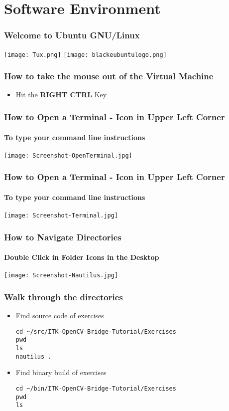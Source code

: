 \section{Software Environment}


\begin{frame}
\frametitle{Welcome to Ubuntu GNU/Linux}
\begin{center}
\texttt{[image: Tux.png]}
\texttt{[image: blackeubuntulogo.png]}
\end{center}
\end{frame}

\begin{frame}
\frametitle{How to take the mouse out of the Virtual Machine}
\begin{itemize}
\item Hit the \textbf{RIGHT CTRL} Key
\end{itemize}
\end{frame}

\begin{frame}
\frametitle{How to Open a Terminal - Icon in Upper Left Corner}
\framesubtitle{To type your command line instructions}
\begin{center}
\texttt{[image: Screenshot-OpenTerminal.jpg]}
\end{center}
\end{frame}

\begin{frame}
\frametitle{How to Open a Terminal - Icon in Upper Left Corner}
\framesubtitle{To type your command line instructions}
\begin{center}
\texttt{[image: Screenshot-Terminal.jpg]}
\end{center}
\end{frame}

\begin{frame}
\frametitle{How to Navigate Directories}
\framesubtitle{Double Click in Folder Icons in the Desktop}
\begin{center}
\texttt{[image: Screenshot-Nautilus.jpg]}
\end{center}
\end{frame}

\begin{frame}[fragile]
\frametitle{Walk through the directories}
\begin{itemize}
\item Find source code of exercises
\begin{verbatim}
cd ~/src/ITK-OpenCV-Bridge-Tutorial/Exercises
pwd
ls
nautilus .
\end{verbatim}
\pause
\item Find binary build of exercises
\begin{verbatim}
cd ~/bin/ITK-OpenCV-Bridge-Tutorial/Exercises
pwd
ls
\end{verbatim}
\end{itemize}
\end{frame}

